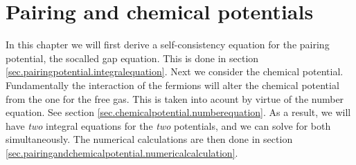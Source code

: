 
\chapter{Pairing and chemical potentials} %

\label{Chapter5} %


In this chapter we will first derive a self-consistency equation for the pairing potential, the socalled gap equation. This is done in section \ref{sec.pairingpotential.integralequation}. Next we consider the chemical potential. Fundamentally the interaction of the fermions will alter the chemical potential from the one for the free gas. This is taken into acount by virtue of the number equation. See section \ref{sec.chemicalpotential.numberequation}. As a result, we will have \textit{two} integral equations for the \textit{two} potentials, and we can solve for both simultaneously. The numerical calculations are then done in section \ref{sec.pairingandchemicalpotential.numericalcalculation}. 

